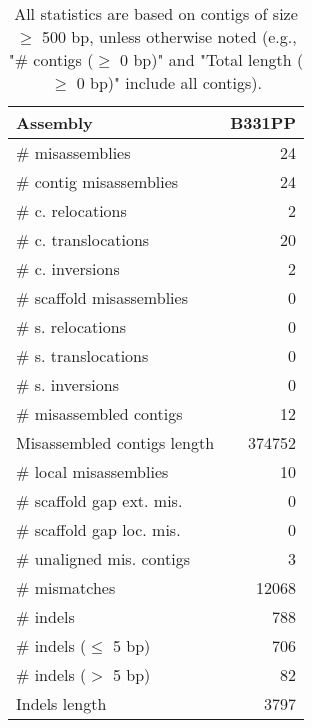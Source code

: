 \documentclass[12pt,a4paper]{article}
\begin{document}
\begin{table}[ht]
\begin{center}
\caption{All statistics are based on contigs of size $\geq$ 500 bp, unless otherwise noted (e.g., "\# contigs ($\geq$ 0 bp)" and "Total length ($\geq$ 0 bp)" include all contigs).}
\begin{tabular}{|l*{1}{|r}|}
\hline
Assembly & B331PP \\ \hline
\# misassemblies & 24 \\ \hline
\hspace{2mm}\# contig misassemblies & 24 \\ \hline
\hspace{5mm}\# c. relocations & 2 \\ \hline
\hspace{5mm}\# c. translocations & 20 \\ \hline
\hspace{5mm}\# c. inversions & 2 \\ \hline
\hspace{2mm}\# scaffold misassemblies & 0 \\ \hline
\hspace{5mm}\# s. relocations & 0 \\ \hline
\hspace{5mm}\# s. translocations & 0 \\ \hline
\hspace{5mm}\# s. inversions & 0 \\ \hline
\# misassembled contigs & 12 \\ \hline
Misassembled contigs length & 374752 \\ \hline
\# local misassemblies & 10 \\ \hline
\# scaffold gap ext. mis. & 0 \\ \hline
\# scaffold gap loc. mis. & 0 \\ \hline
\# unaligned mis. contigs & 3 \\ \hline
\# mismatches & 12068 \\ \hline
\# indels & 788 \\ \hline
\hspace{5mm}\# indels ($\leq$ 5 bp) & 706 \\ \hline
\hspace{5mm}\# indels ($>$ 5 bp) & 82 \\ \hline
Indels length & 3797 \\ \hline
\end{tabular}
\end{center}
\end{table}
\end{document}
